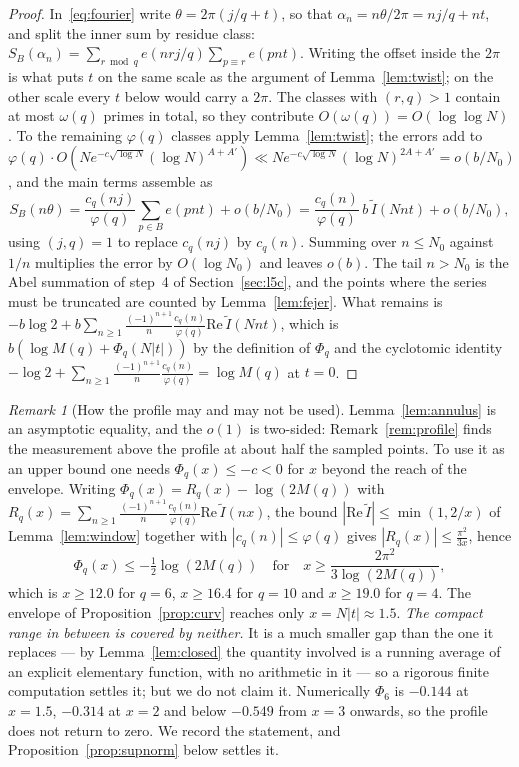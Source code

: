 \documentclass[11pt,a4paper]{article}
\theoremstyle{plain}
\theoremstyle{definition}
\theoremstyle{remark}
\newtheorem{remark}[theorem]{Remark}
\begin{document}
\begin{proof}
In~\eqref{eq:fourier} write $\theta=2\pi(j/q+t)$, so that $\alpha_n=n\theta/2\pi
=nj/q+nt$, and split the inner sum by residue class:
$S_B(\alpha_n)=\sum_{r\bmod q}e(nrj/q)\sum_{p\equiv r}e(pnt)$. Writing the offset
inside the $2\pi$ is what puts $t$ on the same scale as the argument of
Lemma~\ref{lem:twist}; on the other scale every $t$ below would carry a $2\pi$. The classes with $(r,q)>1$ contain at most $\omega(q)$ primes in
total, so they contribute $O(\omega(q))=O(\log\log N)$. To the remaining
$\varphi(q)$ classes apply Lemma~\ref{lem:twist}; the errors add to
$\varphi(q)\cdot O(Ne^{-c\sqrt{\log N}}(\log N)^{A+A'})
\ll Ne^{-c\sqrt{\log N}}(\log N)^{2A+A'}=o(b/N_0)$, and the main terms
assemble as
\[
  S_B(n\theta)=\frac{c_q(nj)}{\varphi(q)}\sum_{p\in B}e(pnt)+o(b/N_0)
  =\frac{c_q(n)}{\varphi(q)}\,b\,\widetilde I(Nnt)+o(b/N_0),
\]
using $(j,q)=1$ to replace $c_q(nj)$ by $c_q(n)$. Summing over $n\le N_0$
against $1/n$ multiplies the error by $O(\log N_0)$ and leaves $o(b)$. The tail
$n>N_0$ is the Abel summation of step~4 of Section~\ref{sec:l5c}, and the points
where the series must be truncated are counted by Lemma~\ref{lem:fejer}. What
remains is $-b\log2+b\sum_{n\ge1}\frac{(-1)^{n+1}}{n}\frac{c_q(n)}{\varphi(q)}
\mathrm{Re}\,\widetilde I(Nnt)$, which is $b(\log M(q)+\Phi_q(N|t|))$ by the
definition of $\Phi_q$ and the cyclotomic identity
$-\log2+\sum_{n\ge1}\frac{(-1)^{n+1}}{n}\frac{c_q(n)}{\varphi(q)}=\log M(q)$ at
$t=0$.
\end{proof}

\begin{remark}[How the profile may and may not be used]\label{rem:profileuse}
Lemma~\ref{lem:annulus} is an asymptotic equality, and the $o(1)$ is two-sided:
Remark~\ref{rem:profile} finds the measurement above the profile at about half
the sampled points. To use it as an upper bound one needs
$\Phi_q(x)\le-c<0$ for $x$ beyond the reach of the envelope. Writing
$\Phi_q(x)=R_q(x)-\log(2M(q))$ with
$R_q(x)=\sum_{n\ge1}\frac{(-1)^{n+1}}{n}\frac{c_q(n)}{\varphi(q)}
\mathrm{Re}\,\widetilde I(nx)$, the bound $|\mathrm{Re}\,\widetilde
I|\le\min(1,2/x)$ of Lemma~\ref{lem:window} together with
$|c_q(n)|\le\varphi(q)$ gives $|R_q(x)|\le\tfrac{\pi^{2}}{3x}$, hence
\[
  \Phi_q(x)\le-\tfrac12\log(2M(q))\quad\text{for}\quad
  x\ge\frac{2\pi^{2}}{3\log(2M(q))},
\]
which is $x\ge12.0$ for $q=6$, $x\ge16.4$ for $q=10$ and $x\ge19.0$ for $q=4$.
The envelope of Proposition~\ref{prop:curv} reaches only $x=N|t|\approx1.5$.
\emph{The compact range in between is covered by neither.} It is a much smaller
gap than the one it replaces --- by Lemma~\ref{lem:closed} the quantity involved
is a running average of an explicit elementary function, with no arithmetic in
it --- so a rigorous finite computation settles it; but we do not claim it.
Numerically $\Phi_6$ is $-0.144$ at $x=1.5$, $-0.314$ at $x=2$ and below
$-0.549$ from $x=3$ onwards, so the profile does not return to zero. We record
the statement, and Proposition~\ref{prop:supnorm} below settles it.
\end{remark}
\end{document}
